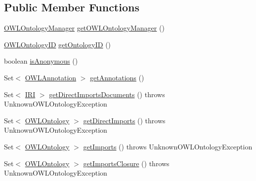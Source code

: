 \subsection*{Public Member Functions}
\begin{DoxyCompactItemize}
\item 
\hyperlink{interfaceorg_1_1semanticweb_1_1owlapi_1_1model_1_1_o_w_l_ontology_manager}{O\-W\-L\-Ontology\-Manager} \hyperlink{interfaceorg_1_1semanticweb_1_1owlapi_1_1model_1_1_o_w_l_ontology_a3d58de238cc1f23c31fde97f030b3058}{get\-O\-W\-L\-Ontology\-Manager} ()
\item 
\hyperlink{classorg_1_1semanticweb_1_1owlapi_1_1model_1_1_o_w_l_ontology_i_d}{O\-W\-L\-Ontology\-I\-D} \hyperlink{interfaceorg_1_1semanticweb_1_1owlapi_1_1model_1_1_o_w_l_ontology_a87a6bc6282a3333c99b2f34b0330729b}{get\-Ontology\-I\-D} ()
\item 
boolean \hyperlink{interfaceorg_1_1semanticweb_1_1owlapi_1_1model_1_1_o_w_l_ontology_a1241eb9132e73188e6a32bd66ff165bd}{is\-Anonymous} ()
\item 
Set$<$ \hyperlink{interfaceorg_1_1semanticweb_1_1owlapi_1_1model_1_1_o_w_l_annotation}{O\-W\-L\-Annotation} $>$ \hyperlink{interfaceorg_1_1semanticweb_1_1owlapi_1_1model_1_1_o_w_l_ontology_a47069e02d864e875ac338bb29df82ab4}{get\-Annotations} ()
\item 
Set$<$ \hyperlink{classorg_1_1semanticweb_1_1owlapi_1_1model_1_1_i_r_i}{I\-R\-I} $>$ \hyperlink{interfaceorg_1_1semanticweb_1_1owlapi_1_1model_1_1_o_w_l_ontology_a9b78b53552c9c1f71709f9c893388e81}{get\-Direct\-Imports\-Documents} ()  throws Unknown\-O\-W\-L\-Ontology\-Exception
\item 
Set$<$ \hyperlink{interfaceorg_1_1semanticweb_1_1owlapi_1_1model_1_1_o_w_l_ontology}{O\-W\-L\-Ontology} $>$ \hyperlink{interfaceorg_1_1semanticweb_1_1owlapi_1_1model_1_1_o_w_l_ontology_a2e1ae99aa7e9b9d2bfae42e1348747e4}{get\-Direct\-Imports} ()  throws Unknown\-O\-W\-L\-Ontology\-Exception
\item 
Set$<$ \hyperlink{interfaceorg_1_1semanticweb_1_1owlapi_1_1model_1_1_o_w_l_ontology}{O\-W\-L\-Ontology} $>$ \hyperlink{interfaceorg_1_1semanticweb_1_1owlapi_1_1model_1_1_o_w_l_ontology_a494f984a2879a4b943ee3e342064fd89}{get\-Imports} ()  throws Unknown\-O\-W\-L\-Ontology\-Exception
\item 
Set$<$ \hyperlink{interfaceorg_1_1semanticweb_1_1owlapi_1_1model_1_1_o_w_l_ontology}{O\-W\-L\-Ontology} $>$ \hyperlink{interfaceorg_1_1semanticweb_1_1owlapi_1_1model_1_1_o_w_l_ontology_a0498eba3a4ae9f428b85a629e0263a8f}{get\-Imports\-Closure} ()  throws Unknown\-O\-W\-L\-Ontology\-Exception

\end{DoxyCompactItemize}
